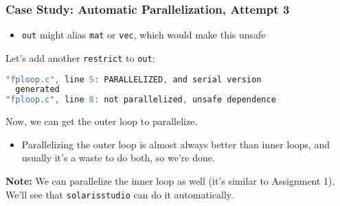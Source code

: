 \begin{frame}[fragile]
  \frametitle{Case Study: Automatic Parallelization, Attempt 3}


  \begin{itemize}
    \item {\tt out} might alias {\tt mat} or {\tt vec}, which would make this
      unsafe
  \end{itemize}

  Let's add another {\tt restrict} to {\tt out}:

  \begin{lstlisting}[language=C]
% solarisstudio-cc -O3 -xautopar -xloopinfo -c fploop.c
"fploop.c", line 5: PARALLELIZED, and serial version
  generated
"fploop.c", line 8: not parallelized, unsafe dependence
  \end{lstlisting}

  Now, we can get the outer loop to parallelize.
  
  \begin{itemize}
    \item Parallelizing the outer loop is almost always better than inner loops,
      and usually it's a waste to do both, so we're done.
  \end{itemize}

  {\bf Note:} We can parallelize the inner loop as well (it's similar to
  Assignment 1). We'll see that {\tt solarisstudio} can do it automatically.


\end{frame}

